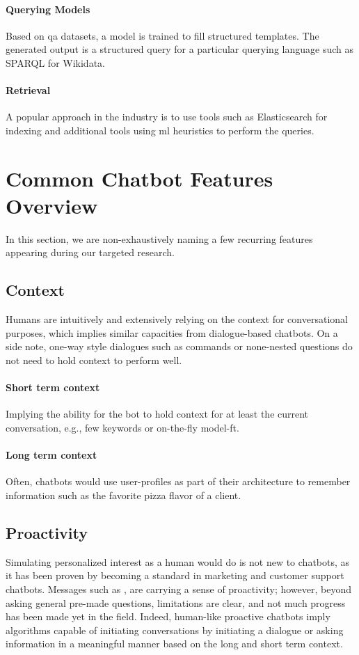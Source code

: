\label{chatbot:templates}
\paragraph{Querying Models} Based on \gls{qa} datasets, a model is trained to fill structured templates.  The generated output is a structured query for a particular querying language such as SPARQL for Wikidata. 

\paragraph{Retrieval} A popular approach in the industry is to use tools such as Elasticsearch for indexing and additional tools using \gls{ml} heuristics to perform the queries.

\clearpage
\section{Common Chatbot Features Overview}
In this section, we are non-exhaustively naming a few recurring features appearing during our targeted research.

\subsection{Context}
Humans are intuitively and extensively relying on the context for conversational purposes, which implies similar capacities from dialogue-based chatbots. On a side note, one-way style dialogues such as commands or none-nested questions do not need to hold context to perform well.

\paragraph{Short term context} Implying the ability for the bot to hold context for at least the current conversation, e.g., few keywords or on-the-fly \gls{model-ft}.

\paragraph{Long term context} Often, chatbots would use user-profiles as part of their architecture to remember information such as the favorite pizza flavor of a client. 

\subsection{Proactivity}
Simulating personalized interest as a human would do is not new to chatbots, as it has been proven by becoming a standard in marketing and customer support chatbots. Messages such as , are carrying a sense of proactivity; however, beyond asking general pre-made questions, limitations are clear, and not much progress has been made yet in the field. Indeed, human-like proactive chatbots imply algorithms capable of initiating conversations by initiating a dialogue or asking information in a meaningful manner based on the long and short term context.


